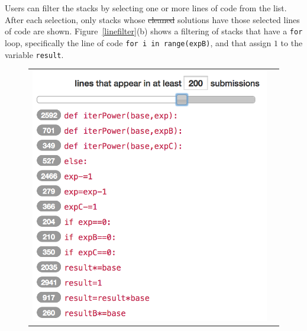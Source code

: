 \documentclass[12pt,twoside]{mitthesis}
\newcommand \codevar[1]{\texttt{#1}}
\providecommand{\DIFaddtex}[1]{{\protect\color{blue}\uwave{#1}}} %
\providecommand{\DIFdeltex}[1]{{\protect\color{red}\sout{#1}}}                      %
\providecommand{\DIFaddbegin}{} %
\providecommand{\DIFaddend}{} %
\providecommand{\DIFdelbegin}{} %
\providecommand{\DIFdelend}{} %
\providecommand{\DIFadd}[1]{\texorpdfstring{\DIFaddtex{#1}}{#1}} %
\providecommand{\DIFdel}[1]{\texorpdfstring{\DIFdeltex{#1}}{}} %
\begin{document}
Users can filter the stacks by selecting one or more lines of code from the list. After each selection, only stacks whose \DIFdelbegin \DIFdel{cleaned }\DIFdelend \DIFaddbegin \DIFadd{platonic }\DIFaddend solutions have those selected lines of code are shown. Figure~\ref{linefilter}(b) shows a filtering of stacks that have a \codevar{for} loop, specifically the line of code \codevar{for i in range(expB)}, and that assign $1$ to the variable \codevar{result}.

\begin{figure}[htpb]
\begin{tabular}{c | c}
\begin{minipage}{.48\linewidth}
\centering
\includegraphics[scale=0.5]{Body/figures/overcode/lineSlider.png}
\end{minipage}
&
\begin{minipage}{.52\linewidth}
\centering

\end{minipage}
\end{tabular}
\end{figure}
\end{document}
